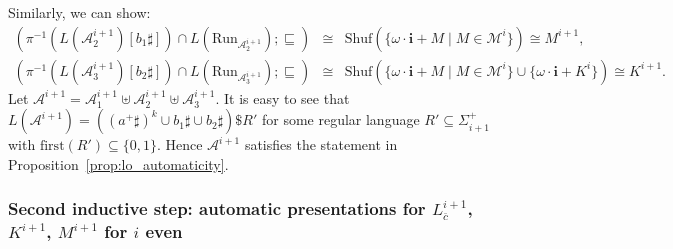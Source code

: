 \documentclass[envcountsame]{llncs}
\newcommand{\A}{\mathcal A}
\newcommand{\first}{\mathrm{first}}
\newcommand{\M}{\mathcal M}
\newcommand{\Run}{\mathrm{Run}}
\newcommand{\Shuf}{\mathrm{Shuf}}
\begin{document}
Similarly, we can show:
\begin{eqnarray*}
(\pi^{-1}(L(\A^{i+1}_2)[b_1\sharp]) \cap L(\Run_{\A^{i+1}_2}); \sqsubseteq)
  & \cong & \Shuf(\{\omega\cdot \mathbf{i}+M\mid M\in \M^i\}) \cong  M^{i+1}, \\
(\pi^{-1}(L(\A^{i+1}_3)[b_2\sharp])\cap L(\Run_{\A^{i+1}_3}); \sqsubseteq) 
 & \cong & \Shuf(\{\omega\cdot \mathbf{i}+M\mid M\in \M^i\} \cup \{\omega\cdot
 \mathbf{i}+K^i\}) \cong  K^{i+1}.
\end{eqnarray*}
Let $\A^{i+1} =  \A^{i+1}_1\uplus \A^{i+1}_2 \uplus \A^{i+1}_3$. 
It is easy to see that  $L(\A^{i+1}) = ((a^+\sharp)^{k} \cup
b_1\sharp \cup b_2\sharp) \$ R'$ 
for some regular language $R' \subseteq \Sigma_{i+1}^+$ with $\first(R')
\subseteq \{0,1\}$. 
Hence $\A^{i+1}$ satisfies the statement in Proposition~\ref{prop:lo_automaticity}.


\subsubsection{Second inductive step: automatic presentations for
  $L^{i+1}_{\overline{c}}$, $K^{i+1}$, $M^{i+1}$ for $i$ even}
\end{document}
